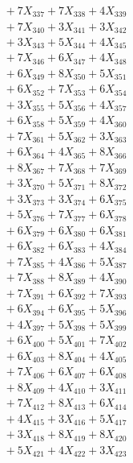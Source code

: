 \documentclass[a4paper,10pt]{article}
\begin{document}
{\begin{align}
&\;  + 7 X_{337} + 7 X_{338} + 4 X_{339} \\[0.5ex]\allowbreak
&\;  + 7 X_{340} + 3 X_{341} + 3 X_{342} \\[0.3ex]
&\;  + 3 X_{343} + 5 X_{344} + 4 X_{345} \\[0.3ex]
&\;  + 7 X_{346} + 6 X_{347} + 4 X_{348} \\[0.3ex]
&\;  + 6 X_{349} + 8 X_{350} + 5 X_{351} \\[0.3ex]
&\;  + 6 X_{352} + 7 X_{353} + 6 X_{354} \\[0.3ex]
&\;  + 3 X_{355} + 5 X_{356} + 4 X_{357} \\[0.3ex]
&\;  + 6 X_{358} + 5 X_{359} + 4 X_{360} \\[0.3ex]
&\;  + 7 X_{361} + 5 X_{362} + 3 X_{363} \\[0.3ex]
&\;  + 6 X_{364} + 4 X_{365} + 8 X_{366} \\[0.3ex]
&\;  + 8 X_{367} + 7 X_{368} + 7 X_{369} \\[0.5ex]\allowbreak
&\;  + 3 X_{370} + 5 X_{371} + 8 X_{372} \\[0.3ex]
&\;  + 3 X_{373} + 3 X_{374} + 6 X_{375} \\[0.3ex]
&\;  + 5 X_{376} + 7 X_{377} + 6 X_{378} \\[0.3ex]
&\;  + 6 X_{379} + 6 X_{380} + 6 X_{381} \\[0.3ex]
&\;  + 6 X_{382} + 6 X_{383} + 4 X_{384} \\[0.3ex]
&\;  + 7 X_{385} + 4 X_{386} + 5 X_{387} \\[0.3ex]
&\;  + 7 X_{388} + 8 X_{389} + 4 X_{390} \\[0.3ex]
&\;  + 7 X_{391} + 6 X_{392} + 7 X_{393} \\[0.3ex]
&\;  + 6 X_{394} + 6 X_{395} + 5 X_{396} \\[0.3ex]
&\;  + 4 X_{397} + 5 X_{398} + 5 X_{399} \\[0.5ex]\allowbreak
&\;  + 6 X_{400} + 5 X_{401} + 7 X_{402} \\[0.3ex]
&\;  + 6 X_{403} + 8 X_{404} + 4 X_{405} \\[0.3ex]
&\;  + 7 X_{406} + 6 X_{407} + 6 X_{408} \\[0.3ex]
&\;  + 8 X_{409} + 4 X_{410} + 3 X_{411} \\[0.3ex]
&\;  + 7 X_{412} + 8 X_{413} + 6 X_{414} \\[0.3ex]
&\;  + 4 X_{415} + 3 X_{416} + 5 X_{417} \\[0.3ex]
&\;  + 3 X_{418} + 8 X_{419} + 8 X_{420} \\[0.3ex]
&\;  + 5 X_{421} + 4 X_{422} + 3 X_{423} \\[0.3ex]

\end{align}}
\end{document}
